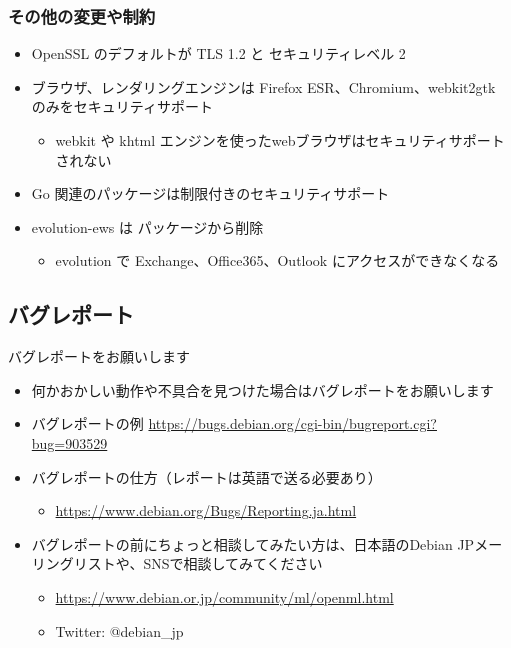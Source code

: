 \documentclass[mingoth,a4paper]{jsarticle}
\begin{document}
\subsubsection{その他の変更や制約}%

\begin{itemize}
\item OpenSSL のデフォルトが TLS 1.2 と セキュリティレベル 2
\item ブラウザ、レンダリングエンジンは Firefox ESR、Chromium、webkit2gtk のみをセキュリティサポート
  \begin{itemize}
  \item webkit や khtml エンジンを使ったwebブラウザはセキュリティサポートされない
  \end{itemize}
\item Go 関連のパッケージは制限付きのセキュリティサポート
\item evolution-ews は パッケージから削除
  \begin{itemize}
  \item evolution で Exchange、Office365、Outlook にアクセスができなくなる
  \end{itemize}
\end{itemize}




\subsection{バグレポート}

{バグレポートをお願いします}%
  \begin{itemize}
  \item 何かおかしい動作や不具合を見つけた場合はバグレポートをお願いします
  \item バグレポートの例 \url{https://bugs.debian.org/cgi-bin/bugreport.cgi?bug=903529}
  \item バグレポートの仕方（レポートは英語で送る必要あり）
    \begin{itemize}
    \item \url{https://www.debian.org/Bugs/Reporting.ja.html}
    \end{itemize}
  \item バグレポートの前にちょっと相談してみたい方は、日本語のDebian JPメーリングリストや、SNSで相談してみてください
    \begin{itemize}
    \item \url{https://www.debian.or.jp/community/ml/openml.html}
    \item Twitter: @debian\_jp
    \end{itemize}
  \end{itemize}
\end{document}
